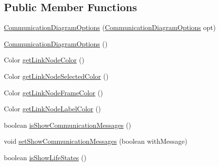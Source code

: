 \subsection*{Public Member Functions}
\begin{DoxyCompactItemize}
\item 
\hyperlink{classorg_1_1tzi_1_1use_1_1gui_1_1views_1_1diagrams_1_1behavior_1_1communicationdiagram_1_1_communication_diagram_options_a4020d33f72d20891d10c106d6f17bc5b}{Communication\-Diagram\-Options} (\hyperlink{classorg_1_1tzi_1_1use_1_1gui_1_1views_1_1diagrams_1_1behavior_1_1communicationdiagram_1_1_communication_diagram_options}{Communication\-Diagram\-Options} opt)
\item 
\hyperlink{classorg_1_1tzi_1_1use_1_1gui_1_1views_1_1diagrams_1_1behavior_1_1communicationdiagram_1_1_communication_diagram_options_af89b6e8ae96ef4728398d45a7bb4ec07}{Communication\-Diagram\-Options} ()
\item 
Color \hyperlink{classorg_1_1tzi_1_1use_1_1gui_1_1views_1_1diagrams_1_1behavior_1_1communicationdiagram_1_1_communication_diagram_options_acf59aa51554b1f7e6817b0828cdd98ff}{get\-Link\-Node\-Color} ()
\item 
Color \hyperlink{classorg_1_1tzi_1_1use_1_1gui_1_1views_1_1diagrams_1_1behavior_1_1communicationdiagram_1_1_communication_diagram_options_a33661407b4ab208aa7117846a9372c63}{get\-Link\-Node\-Selected\-Color} ()
\item 
Color \hyperlink{classorg_1_1tzi_1_1use_1_1gui_1_1views_1_1diagrams_1_1behavior_1_1communicationdiagram_1_1_communication_diagram_options_ae6d660851c7e1e9a99991369d85b449b}{get\-Link\-Node\-Frame\-Color} ()
\item 
Color \hyperlink{classorg_1_1tzi_1_1use_1_1gui_1_1views_1_1diagrams_1_1behavior_1_1communicationdiagram_1_1_communication_diagram_options_a01b836236678ebcaa55469d93b07108e}{get\-Link\-Node\-Label\-Color} ()
\item 
boolean \hyperlink{classorg_1_1tzi_1_1use_1_1gui_1_1views_1_1diagrams_1_1behavior_1_1communicationdiagram_1_1_communication_diagram_options_ad8ed8ad229177422054a18e12228c21d}{is\-Show\-Communication\-Messages} ()
\item 
void \hyperlink{classorg_1_1tzi_1_1use_1_1gui_1_1views_1_1diagrams_1_1behavior_1_1communicationdiagram_1_1_communication_diagram_options_a1fde24ef3175c474bb3571db7ab0b598}{set\-Show\-Communication\-Messages} (boolean with\-Message)
\item 
boolean \hyperlink{classorg_1_1tzi_1_1use_1_1gui_1_1views_1_1diagrams_1_1behavior_1_1communicationdiagram_1_1_communication_diagram_options_a5583a3509df1fab5f0cf64a627ecc629}{is\-Show\-Life\-States} ()

\end{DoxyCompactItemize}
